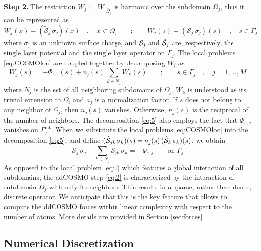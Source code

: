 {\bf Step 2.} The restriction $W_j := W |_{\overline{\Omega}_j}$ is harmonic over the subdomain $\Omega_j$, thus it can be represented as 
\begin{equation}\label{eq:COSMOloc}
W_j(x) = (\tilde{\mathcal{S}}_j \,  \sigma_j) (x) \quad , \quad x \in \Omega_j \qquad ; \qquad
W_j(s) = (\mathcal{S}_j \,  \sigma_j) (s) \quad , \quad s \in \Gamma_j
\end{equation}
where $\sigma_j$ is an unknown surface charge, and $\mathcal{S}_j$ and $\tilde{\mathcal{S}}_j$ are, respectively, the single layer potential and the single layer operator on $\Gamma_j$. The local problems \eqref{eq:COSMOloc} are coupled together by decomposing $W_j$ as
\begin{equation}\label{eq:5}
W_j(s) = - \Phi_{\varepsilon,j}(s) +  n_j(s) \, \sum_{k \in N_j} {W}_k(s) \qquad ; \qquad s \in \Gamma_j \quad , \quad j = 1, \ldots , M
\end{equation}
where $N_j$ is the set of all neighboring subdomains of $\Omega_j$, $W_k$ is understood as its trivial extension to $\Omega$, and $n_j$ is a normalization factor. If $s$ does not belong to any neighbor of $\Omega_j$, then $n_j(s)$ vanishes. Otherwise, $n_j(s)$ is the reciprocal of the number of neighbors. The decomposition \eqref{eq:5} also employs the fact that $\Phi_{\varepsilon,j}$ vanishes on $\Gamma_j^\text{int}$. When we substitute the local problems \eqref{eq:COSMOloc} into the decomposition \eqref{eq:5}, and define $(\tilde{\mathcal{S}}_{jk} \, \sigma_k) (s) = n_j(s) \, (\tilde{\mathcal{S}}_k \, \sigma_k)(s)$, we obtain
\begin{equation}\label{eq:2}
\mathcal{S}_j \, \sigma_j  -  \sum_{k \in N_j} \tilde{\mathcal{S}}_{jk} \, \sigma_k = -  \Phi_{\varepsilon,j} \qquad \text{on } \Gamma_j
\end{equation}
As opposed to the local problem \eqref{eq:1} which features a global interaction of all subdomains, the ddCOSMO step \eqref{eq:2} is characterized by the interaction of subdomain $\Omega_j$ with only its neighbors. This results in a sparse, rather than dense, discrete operator. We anticipate that this is the key feature that allows to compute the ddCOSMO forces within linear complexity with respect to the number of atoms. More details are provided in Section \ref{sec:forces}.

\subsection{Numerical Discretization}


